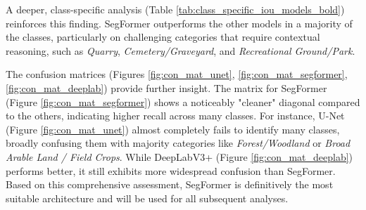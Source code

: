 \documentclass{report}
\begin{document}
A deeper, class-specific analysis (Table \ref{tab:class_specific_iou_models_bold}) reinforces this finding. SegFormer outperforms the other models in a majority of the classes, particularly on challenging categories that require contextual reasoning, such as \textit{Quarry}, \textit{Cemetery/Graveyard}, and \textit{Recreational Ground/Park}. \par
The confusion matrices (Figures \ref{fig:con_mat_unet}, \ref{fig:con_mat_segformer}, \ref{fig:con_mat_deeplab}) provide further insight. The matrix for SegFormer (Figure \ref{fig:con_mat_segformer}) shows a noticeably "cleaner" diagonal compared to the others, indicating higher recall across many classes. For instance, U-Net (Figure \ref{fig:con_mat_unet}) almost completely fails to identify many classes, broadly confusing them with majority categories like \textit{Forest/Woodland} or \textit{Broad Arable Land / Field Crops}. While DeepLabV3+ (Figure \ref{fig:con_mat_deeplab}) performs better, it still exhibits more widespread confusion than SegFormer. Based on this comprehensive assessment, SegFormer is definitively the most suitable architecture and will be used for all subsequent analyses.
\end{document}
